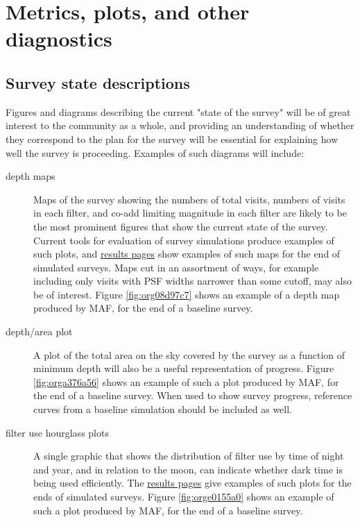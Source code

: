 \section{Metrics, plots, and other diagnostics}
\label{sec:orgf5d938a}
\subsection{Survey state descriptions}
\label{sec:orgca8776a}
Figures and diagrams describing the current "state of the survey" will be of great interest to the community as a whole, and providing an understanding of whether they correspond to the plan for the survey will be essential for explaining how well the survey is proceeding.
Examples of such diagrams will include:

\begin{description}
\item[{depth maps}] Maps of the survey showing the numbers of total visits, numbers of visits in each filter, and co-add limiting magnitude in each filter are likely to be the most prominent figures that show the current state of the survey. Current tools for evaluation of survey simulations produce examples of such plots, and \href{http://astro-lsst-01.astro.washington.edu:8081/allMetricResults?runId=392\#Basic\%20Maps}{results pages} show examples of such maps for the end of simulated surveys. Maps cut in an assortment of ways, for example including only visits with PSF widths narrower than some cutoff, may also be of interest. Figure \ref{fig:org08d97c7} shows an example of a depth map produced by MAF, for the end of a baseline survey.
\item[{depth/area plot}] A plot of the total area on the sky covered by the survey as a function of minimum depth will also be a useful representation of progress. Figure \ref{fig:orga376a56} shows an example of such a plot produced by MAF, for the end of a baseline survey. When used to show survey progress, reference curves from a baseline simulation should be included as well.
\item[{filter use hourglass plots}] A single graphic that shows the distribution of filter use by time of night and year, and in relation to the moon, can indicate whether dark time is being used efficiently. The \href{http://astro-lsst-01.astro.washington.edu:8081/allMetricResults?runId=392\#Hourglass}{results pages} give examples of such plots for the ends of simulated surveys. Figure \ref{fig:orge0155a0} shows an example of such a plot produced by MAF, for the end of a baseline survey.

\end{description}
